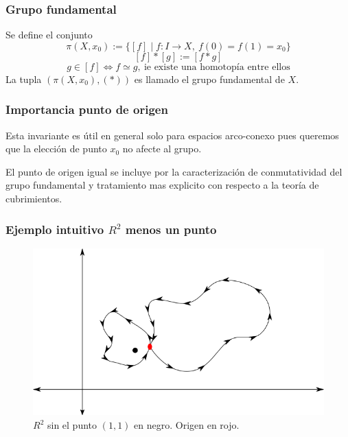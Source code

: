 \documentclass[xetex,mathserif,serif]{beamer}
\begin{document}
  \begin{frame}
    \frametitle{Grupo fundamental}
      Se define el conjunto
      \[ \pi (X, x_0) := \{ [f] \mid f : I \to X ,\ f(0) = f(1) = x_0
        \} \]
      \[ [f] * [g] := [f * g]\]
      \[ g \in [f] \iff f \simeq g ,\ \text{ie existe una homotopía
          entre ellos}\]
      La tupla \(\left(\pi(X, x_0), (*) \right) \) es llamado el grupo
      fundamental de \(X\).
  \end{frame}

  \begin{frame}
    \frametitle{Importancia punto de origen}
    \begin{block}{}
      Esta invariante es útil en general solo para espacios arco-conexo
      pues queremos que la elección de punto \(x_0\) no afecte al grupo. \\

      \centering
    \end{block}

    \pause

    \begin{block}{}
      El punto de origen igual se incluye por la caracterización de
      conmutatividad del grupo fundamental y tratamiento mas explicito con
      respecto a la teoría de cubrimientos.
    \end{block}
  \end{frame}

  \begin{frame}
    \frametitle{Ejemplo intuitivo \(R^2\) menos un punto}
    \begin{figure}[h]
      \centering
      \includegraphics[scale=0.5]{../tesis/imagenes/R2-punto.png}
      \caption{\(R^2\) sin el punto \((1,1)\) en negro. Origen en rojo. }
    \end{figure}

  \end{frame}
\end{document}
